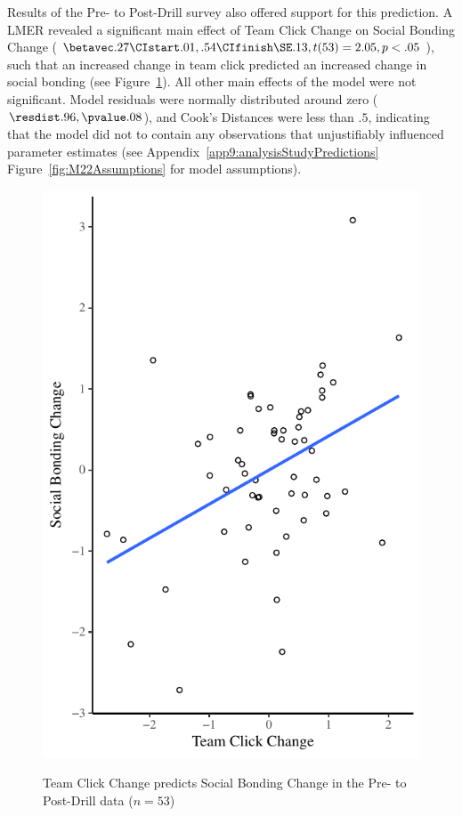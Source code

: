 \begin{CJK}{UTF8}{gbsn}
Results of the Pre- to Post-Drill survey also offered support for this prediction.  A LMER revealed a significant main effect of Team Click Change on Social Bonding Change ($\betavec .27 \CIstart .01, .54 \CIfinish \SE .13, t(53) = 2.05, p < .05$), such that an increased change in team click predicted an increased change in social bonding (see Figure~\ref{fig:groupClickBondingChangeCondition}).  All other main effects of the model were not significant. Model residuals were normally distributed around zero ($\resdist .96, \pvalue .08$), and Cook's Distances were less than $.5$, indicating that the model did not to contain any observations that unjustifiably influenced parameter estimates (see Appendix~\ref{app9:analysisStudyPredictions} Figure~\ref{fig:M22Assumptions} for model assumptions).






\begin{figure}
  \centering
    \includegraphics[width=0.5\linewidth,keepaspectratio] {images/groupClickBondingChangeCondition}
    \label{fig:groupClickBondingChangeCondition}
    \caption{Team Click Change predicts Social Bonding Change in the Pre- to Post-Drill data ($n = 53$)}
\end{figure}


\end{CJK}
